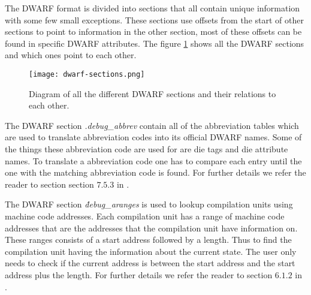  


The \gls{DWARF} format is divided into sections that all contain unique information with some few small exceptions.
These sections use offsets from the start of other sections to point to information in the other section, most of these offsets can be found in specific \gls{DWARF} attributes.
The figure \ref{fig:dwarfsections} shows all the \gls{DWARF} sections and which ones point to each other.




\begin{figure}[h]
	\centering
	\texttt{[image: dwarf-sections.png]}
	\caption{Diagram of all the different \gls{DWARF} sections and their relations to each other.}
	\label{fig:dwarfsections}
\end{figure}


The \gls{DWARF} section \emph{.debug\_abbrev} contain all of the abbreviation tables which are used to translate abbreviation codes into its official \gls{DWARF} names.
Some of the things these abbreviation code are used for are \gls{die} tags and \gls{die} attribute names.
To translate a abbreviation code one has to compare each entry until the one with the matching abbreviation code is found.
For further details we refer the reader to section section $7.5.3$ in \cite{dwarf}.


The \gls{DWARF} section \emph{\.debug\_aranges} is used to lookup compilation units using machine code addresses.
Each compilation unit has a range of machine code addresses that are the addresses that the compilation unit have information on.
These ranges consists of a start address followed by a length.
Thus to find the compilation unit having the information about the current state.
The user only needs to check if the current address is between the start address and the start address plus the length.
For further details we refer the reader to section $6.1.2$ in \cite{dwarf}.


